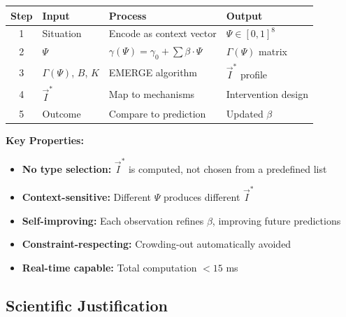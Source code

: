 \begin{tcolorbox}[colback=blue!5!white, colframe=blue!75!black,
    title=\textbf{Summary: From Context to Intervention}]

\begin{center}
\begin{tabular}{@{}clll@{}}
\toprule
\textbf{Step} & \textbf{Input} & \textbf{Process} & \textbf{Output} \\
\midrule
1 & Situation & Encode as context vector & $\Psi \in [0,1]^8$ \\
2 & $\Psi$ & $\gamma(\Psi) = \gamma_0 + \sum \beta \cdot \Psi$ & $\Gamma(\Psi)$ matrix \\
3 & $\Gamma(\Psi)$, $B$, $K$ & EMERGE algorithm & $\vec{I}^*$ profile \\
4 & $\vec{I}^*$ & Map to mechanisms & Intervention design \\
5 & Outcome & Compare to prediction & Updated $\beta$ \\
\bottomrule
\end{tabular}
\end{center}

\textbf{Key Properties:}
\begin{itemize}[nosep]
    \item \textbf{No type selection:} $\vec{I}^*$ is computed, not chosen from a predefined list
    \item \textbf{Context-sensitive:} Different $\Psi$ produces different $\vec{I}^*$
    \item \textbf{Self-improving:} Each observation refines $\beta$, improving future predictions
    \item \textbf{Constraint-respecting:} Crowding-out automatically avoided
    \item \textbf{Real-time capable:} Total computation $< 15$ ms
\end{itemize}

\end{tcolorbox}

\subsection{Scientific Justification}
\label{subsec:scientific-justification}

